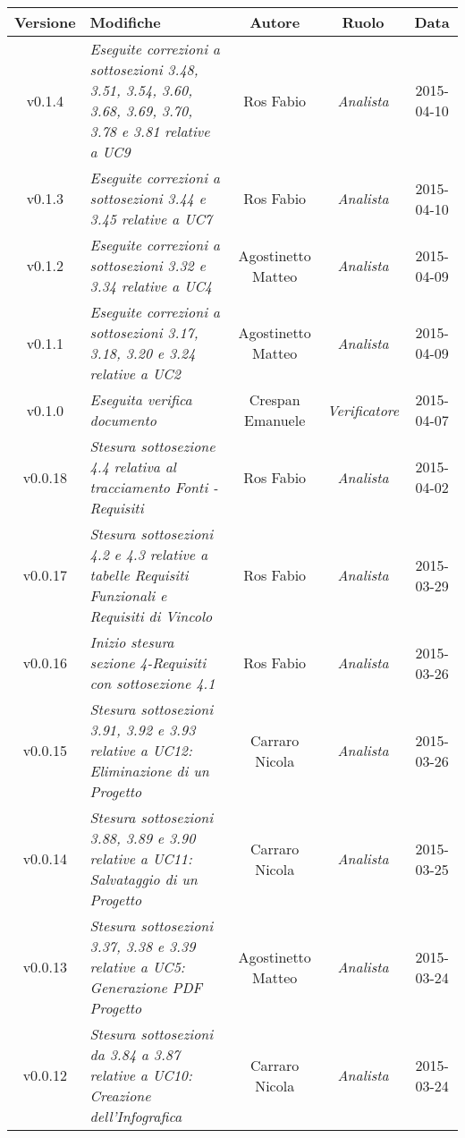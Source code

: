 \begin{table}[h]
\centering
\begin{tabular}{|c|p{}|c|c|c|}
	\toprule
		\textbf{Versione} & \textbf{Modifiche} & \textbf{Autore} & \textbf{Ruolo} & \textbf{Data}\\
	\midrule
	\midrule
		v0.1.4 & \textit{Eseguite correzioni a sottosezioni 3.48, 3.51, 3.54, 3.60, 3.68, 3.69, 3.70, 3.78  e 3.81 relative a UC9} & Ros Fabio & \textit{Analista} & 2015-04-10\\
	\midrule
		v0.1.3 & \textit{Eseguite correzioni a sottosezioni 3.44 e 3.45 relative a UC7} & Ros Fabio & \textit{Analista} & 2015-04-10\\
	\midrule
		v0.1.2 & \textit{Eseguite correzioni a sottosezioni 3.32 e 3.34 relative a UC4} & Agostinetto Matteo & \textit{Analista} & 2015-04-09\\
	\midrule
		v0.1.1 & \textit{Eseguite correzioni a sottosezioni 3.17, 3.18, 3.20 e 3.24 relative a UC2} & Agostinetto Matteo & \textit{Analista} & 2015-04-09\\
	\midrule
		v0.1.0 & \textit{Eseguita verifica documento} & Crespan Emanuele & \textit{Verificatore} & 2015-04-07\\
	\midrule
		v0.0.18 & \textit{Stesura sottosezione 4.4 relativa al tracciamento Fonti - Requisiti} & Ros Fabio & \textit{Analista} & 2015-04-02\\
	\midrule
		v0.0.17 & \textit{Stesura sottosezioni 4.2 e 4.3 relative a tabelle Requisiti Funzionali e Requisiti di Vincolo} & Ros Fabio & \textit{Analista} & 2015-03-29\\
	\midrule
		v0.0.16 & \textit{Inizio stesura sezione 4-Requisiti con sottosezione 4.1} & Ros Fabio & \textit{Analista} & 2015-03-26\\
	\midrule
		v0.0.15 & \textit{Stesura sottosezioni 3.91, 3.92 e 3.93 relative a UC12: Eliminazione di un Progetto} & Carraro Nicola & \textit{Analista} & 2015-03-26\\
	\midrule
		v0.0.14 & \textit{Stesura sottosezioni 3.88, 3.89 e 3.90 relative a UC11: Salvataggio di un Progetto} & Carraro Nicola & \textit{Analista} & 2015-03-25\\
	\midrule
		v0.0.13 & \textit{Stesura sottosezioni 3.37, 3.38 e 3.39 relative a UC5: Generazione PDF Progetto} & Agostinetto Matteo & \textit{Analista} & 2015-03-24\\
	\midrule
		v0.0.12 & \textit{Stesura sottosezioni da 3.84 a 3.87 relative a UC10: Creazione dell'Infografica} & Carraro Nicola & \textit{Analista} & 2015-03-24\\
	\bottomrule
\end{tabular}
\end{table}
